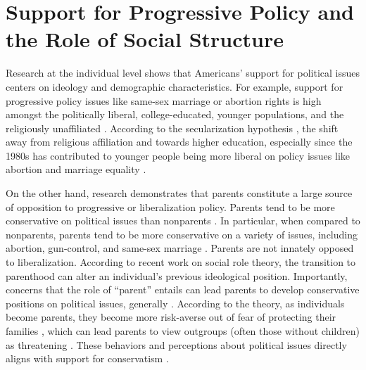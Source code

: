 









\section{Support for Progressive Policy and the Role of Social Structure}


Research at the individual level shows that Americans' support for political issues centers on ideology and demographic characteristics. For example, support for progressive policy issues like same-sex marriage or abortion rights is high amongst the politically liberal, college-educated, younger populations, and the religiously unaffiliated \citep{baunach_2012,zucker_1999,pew_2017_ssm,pew_2017_ab}. According to the secularization hypothesis \citep{treas_2002}, the shift away from religious affiliation and  towards higher education, especially since the 1980s has contributed to younger people being more liberal on policy issues like abortion and marriage equality \citep{sherkat_et_al_2011,zucker_1999}. 

On the other hand, research demonstrates that parents constitute a large source of opposition to progressive or liberalization policy. Parents tend to be more conservative on political issues than nonparents \citep{kerry_and_murray_2018}. In particular, when compared to nonparents, parents tend to be more conservative on a variety of issues, including abortion, gun-control, and same-sex marriage \citep{weeden_and_kurzban_2017,pinsof_and_haselton_2017,kurzban_et_al_2010}. Parents are not innately opposed to liberalization. According to recent work on social role theory, the transition to parenthood can alter an individual's previous ideological position\citep{elder_and_greene_2019}. Importantly, concerns that the role of ``parent'' entails can lead parents to develop conservative positions on political issues, generally \citep{kerry_and_murray_2018,elder_and_greene_2019}. According to the theory, as individuals become parents, they become more risk-averse out of fear of protecting their families \citep{eibach_and_mock_2011}, which can lead parents to view outgroups (often those without children) as threatening \citep{gilead_and_liberman_2014}. These behaviors and perceptions about political issues directly aligns with support for conservatism \citep{crawford_2017}. 


